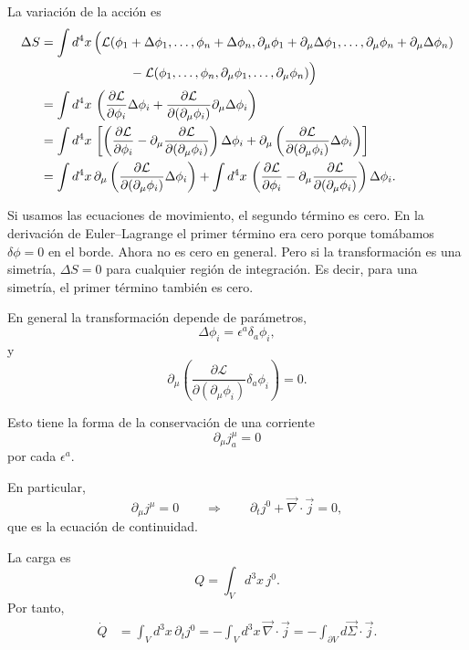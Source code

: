 \documentclass[11pt,a4paper]{article}
\newcommand{\concept}[1]{\textcolor{concept-green}{#1}}
\begin{document}
La variación de la acción es
\begin{align*}
  \Delta S
  &=\int d^4x\,
    \Bigl(
      \mathcal L(\phi_1+\Delta\phi_1,\ldots,
      \phi_n+\Delta\phi_n,
      \partial_\mu\phi_1+\partial_\mu\Delta\phi_1,\ldots,
      \partial_\mu\phi_n+\partial_\mu\Delta\phi_n)\\
  &\hspace{7em}
      -\mathcal L(\phi_1,\ldots,\phi_n,
      \partial_\mu\phi_1,\ldots,\partial_\mu\phi_n)
    \Bigr)\\
  &=\int d^4x\,
    \left(
      \frac{\partial\mathcal L}{\partial\phi_i}\Delta\phi_i
      +\frac{\partial\mathcal L}{\partial(\partial_\mu\phi_i)}
       \partial_\mu\Delta\phi_i
    \right)\\
  &=\int d^4x\,
    \left[
      \left(
        \frac{\partial\mathcal L}{\partial\phi_i}
        -\partial_\mu\frac{\partial\mathcal L}
        {\partial(\partial_\mu\phi_i)}
      \right)\Delta\phi_i
      +\partial_\mu\left(
        \frac{\partial\mathcal L}
        {\partial(\partial_\mu\phi_i)}\Delta\phi_i
      \right)
    \right]\\
  &=\int d^4x\,\partial_\mu\left(
      \frac{\partial\mathcal L}
      {\partial(\partial_\mu\phi_i)}\Delta\phi_i
    \right)
    +\int d^4x\,
    \left(
      \frac{\partial\mathcal L}{\partial\phi_i}
      -\partial_\mu\frac{\partial\mathcal L}
      {\partial(\partial_\mu\phi_i)}
    \right)\Delta\phi_i.
\end{align*}

Si usamos las ecuaciones de movimiento, el segundo término es cero. En la derivación de Euler--Lagrange el primer término era cero porque tomábamos $\delta\phi=0$ en el borde. Ahora no es cero en general. Pero si la transformación es una simetría, $\Delta S=0$ para cualquier región de integración. Es decir, para una simetría, el primer término también es cero.

En general la transformación depende de parámetros,
\[
  \Delta\phi_i=\epsilon^a\delta_a\phi_i,
\]
y
\[
  \partial_\mu\left(
    \frac{\partial\mathcal L}{\partial(\partial_\mu\phi_i)}
    \delta_a\phi_i
  \right)=0.
\]

Esto tiene la forma de la \concept{conservación de una corriente}
\[
  \partial_\mu j_a^\mu=0
\]
por cada $\epsilon^a$.

En particular,
\[
  \partial_\mu j^\mu=0
  \qquad\Longrightarrow\qquad
  \partial_t j^0+\vec\nabla\cdot\vec j=0,
\]
que es la ecuación de continuidad.

La carga es
\[
  Q=\int_V d^3x\,j^0.
\]
Por tanto,
\begin{align*}
  \dot Q
  &=\int_V d^3x\,\partial_tj^0
   =-\int_V d^3x\,\vec\nabla\cdot\vec j
   =-\int_{\partial V}d\vec\Sigma\cdot\vec j.
\end{align*}
\end{document}
